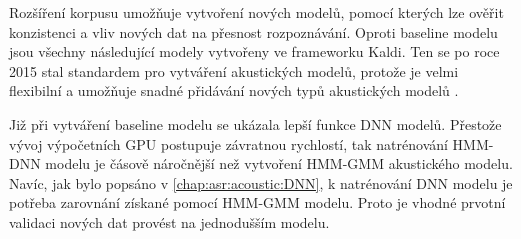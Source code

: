 
Rozšíření korpusu umožňuje vytvoření nových modelů, pomocí kterých lze ověřit konzistenci a vliv nových dat na přesnost rozpoznávání.
Oproti baseline modelu jsou všechny následující modely vytvořeny ve frameworku Kaldi.
Ten se po roce 2015 stal standardem pro vytváření akustických modelů, protože je velmi flexibilní a umožňuje snadné přidávání nových typů akustických modelů \cite{Kaldi2011}.


Již při vytváření baseline modelu se ukázala lepší funkce DNN modelů.
Přestože vývoj výpočetních GPU postupuje závratnou rychlostí, tak natrénování HMM-DNN modelu je čásově náročnější než vytvoření HMM-GMM akustického modelu.
Navíc, jak bylo popsáno v \ref{chap:asr:acoustic:DNN}, k natrénování DNN modelu je potřeba zarovnání získané pomocí HMM-GMM modelu.
Proto je vhodné prvotní validaci nových dat provést na jednodušším modelu.




